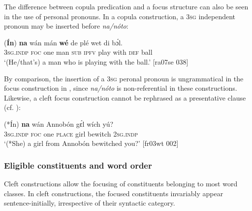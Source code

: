 \ea%
    \label{ex:key:698}
\z\z

The difference between copula predication and a focus structure can also be seen in the use of personal pronouns. In a copula construction, a \textsc{3sg} independent pronoun may be inserted before \textit{na}\textit{\textup{/}}\textit{nóto}:


\ea%
    \label{ex:key:699}
    \gll \textup{(}\textbf{\'{I}n}\textup{)}    \textbf{na}  wán   mán  \textbf{wé}  de  plé  wet    di  bɔ́l.\\
\textsc{3sg.indp}  \textsc{foc}  one    man    \textsc{sub}  \textsc{ipfv}  play  with    \textsc{def}  ball\\

\glt ‘(He/that’s) a man who is playing with the ball.’ [ra07se 038]
\z

By comparison, the insertion of a \textsc{3sg} peronal pronoun is ungrammatical in the focus construction in , since \textit{na/nóto} is non-referential in these constructions. Likewise, a cleft focus construction cannot be rephrased as a presentative clause (cf. ):


\ea%
    \label{ex:key:700}
    \gll \textup{(}*\'{I}n\textup{)}  \textbf{na}  wán    Annobón  gɛ́l    wích  yú?\\
\textsc{3sg.indp}  \textsc{foc}  one    \textsc{place}    girl    bewitch  \textsc{2sg.indp}\\

\glt ‘(*She) a girl from Annobón bewitched you?’ [fr03wt 002]
\z

\subsubsection{Eligible constituents and word order}\label{sec:7.4.3.2}
Cleft constructions allow the focusing of constituents belonging to most word classes. In cleft constructions, the focused constituents invariably appear sentence-initially, irrespective of their syntactic category.


